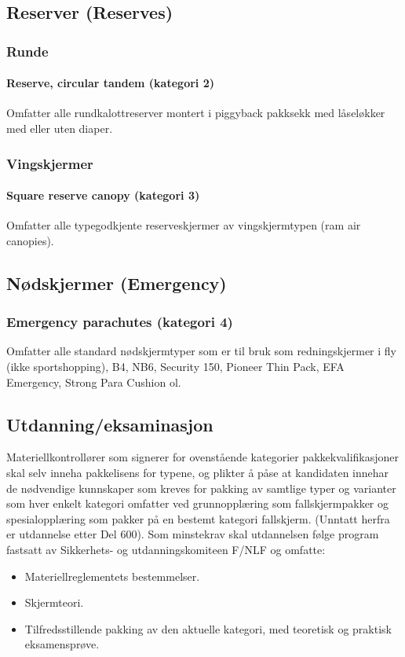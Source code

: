 \subsection{Reserver (Reserves)}
\subsubsection{Runde}
\paragraph{Reserve, circular tandem (kategori 2)}
Omfatter alle rundkalottreserver montert i piggyback pakksekk med låseløkker med eller uten diaper.

\subsubsection{Vingskjermer}
\paragraph{Square reserve canopy (kategori 3)}
Omfatter alle typegodkjente reserveskjermer av vingskjermtypen (ram air canopies).

\subsection{Nødskjermer (Emergency)}
\subsubsection{Emergency parachutes (kategori 4)}
Omfatter alle standard nødskjermtyper som er til bruk som redningskjermer i fly (ikke sportshopping), B4, NB6, Security 150, Pioneer Thin Pack, EFA Emergency, Strong Para Cushion ol.

\subsection{Utdanning/eksaminasjon}
Materiellkontrollører som signerer for ovenstående kategorier pakkekvalifikasjoner skal selv inneha pakkelisens for typene, og plikter å påse at kandidaten innehar de nødvendige kunnskaper som kreves for pakking av samtlige typer og varianter som hver enkelt kategori omfatter ved grunnopplæring som fallskjermpakker og spesialopplæring som pakker på en bestemt kategori fallskjerm. (Unntatt herfra er utdannelse etter Del 600). Som minstekrav skal utdannelsen følge program fastsatt av Sikkerhets- og utdanningskomiteen F/NLF og omfatte:
\begin{itemize}
	\item Materiellreglementets bestemmelser.
	\item Skjermteori.
	\item Tilfredsstillende pakking av den aktuelle kategori, med teoretisk og praktisk eksamensprøve.
\end{itemize}

